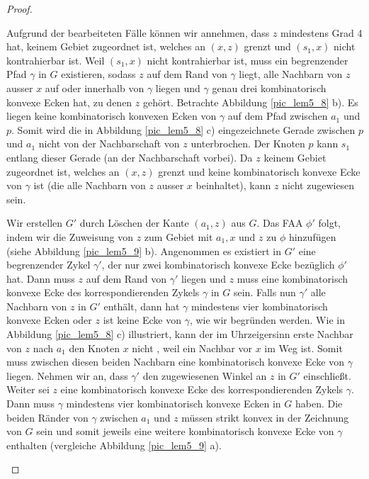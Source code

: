 \begin{proof}
\begin{description}[leftmargin =0pt, font = \rmfamily ,listparindent=\parindent,parsep=0pt]
\item[Fall 1d:] Aufgrund der bearbeiteten Fälle können wir annehmen, dass $z$ mindestens Grad 4 hat, keinem Gebiet zugeordnet ist, welches an $(x,z)$ grenzt und $(s_1,x)$ nicht kontrahierbar ist. Weil $(s_1,x)$ nicht kontrahierbar ist, muss ein begrenzender Pfad $\gamma$ in $G$ existieren, sodass $z$ auf dem Rand von $\gamma$ liegt, alle Nachbarn von $z$ ausser $x$ auf oder innerhalb von $\gamma$ liegen und $\gamma$ genau drei kombinatorisch konvexe Ecken hat, zu denen $z$ gehört. Betrachte Abbildung \ref{pic_lem5_8} b). Es liegen keine kombinatorisch konvexen Ecken von $\gamma$ auf dem Pfad zwischen $a_1$ und $p$. Somit wird die in Abbildung \ref{pic_lem5_8} c) eingezeichnete Gerade zwischen $p$ und $a_1$ nicht von der Nachbarschaft von $z$ unterbrochen. Der Knoten $p$ kann $s_1$ entlang dieser Gerade \grqq{ } (an der Nachbarschaft vorbei). Da $z$ keinem Gebiet zugeordnet ist, welches an $(x,z)$ grenzt und keine kombinatorisch konvexe Ecke von $\gamma$ ist (die alle Nachbarn von $z$ ausser $x$ beinhaltet), kann $z$ nicht zugewiesen sein. 

Wir erstellen $G'$ durch Löschen der Kante $(a_1,z)$ aus $G$. Das FAA $\phi'$ folgt, indem wir die Zuweisung von $z$ zum Gebiet mit $a_1,x$ und $z$ zu $\phi$ hinzufügen (siehe Abbildung \ref{pic_lem5_9} b). Angenommen es existiert in $G'$ eine begrenzender Zykel $\gamma'$, der nur zwei kombinatorisch konvexe Ecke bezüglich $\phi'$ hat. Dann muss $z$ auf dem Rand von $\gamma'$ liegen und $z$ muss eine kombinatorisch konvexe Ecke des korrespondierenden Zykels $\gamma$ in $G$ sein. Falls nun $\gamma'$ alle Nachbarn von $z$ in $G'$ enthält, dann hat $\gamma$ mindestens vier kombinatorisch konvexe Ecken oder $z$ ist keine Ecke von $\gamma$, wie wir begründen werden. Wie in Abbildung \ref{pic_lem5_8} c) illustriert, kann der im Uhrzeigersinn erste Nachbar von $z$ nach $a_1$ den Knoten $x$ nicht \grqq, weil ein Nachbar vor $x$ im Weg ist. Somit muss zwischen diesen beiden Nachbarn eine kombinatorisch konvexe Ecke von $\gamma$ liegen. Nehmen wir an, dass $\gamma'$ den zugewiesenen Winkel an $z$ in $G'$ einschließt. Weiter sei $z$ eine kombinatorisch konvexe Ecke des korrespondierenden Zykels $\gamma$. Dann muss $\gamma$ mindestens vier kombinatorisch konvexe Ecken in $G$ haben. Die beiden Ränder von $\gamma$ zwischen $a_1$ und $z$ müssen strikt konvex in der Zeichnung von $G$ sein und somit jeweils eine weitere kombinatorisch konvexe Ecke von $\gamma$ enthalten (vergleiche Abbildung \ref{pic_lem5_9} a).


\end{description}
\end{proof}
